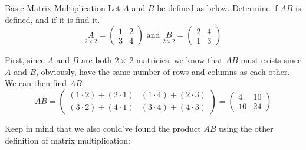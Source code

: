 \begin{example}{Basic Matrix Multiplication}{}
    Let $A$ and $B$ be defined as below. Determine if $AB$ is defined, and if it is find it.
    \[
        \underset{2 \times 2}{A} = \begin{pmatrix}
            1 & 2 \\ 3 & 4
        \end{pmatrix} 
        \text{ and }
        \underset{2 \times 2}{B} = \begin{pmatrix}
            2 & 4 \\ 1 & 3
        \end{pmatrix}
    \]
    \begin{solution}
        First, since $A$ and $B$ are both $2\times\,2$ matricies, we know that $AB$ must exists since $A$ and $B$, obviously, have the same number of rows and columns as each other. We can then find $AB$:
        \[
            AB = \begin{pmatrix}
                (1 \cdot 2) + (2 \cdot 1) & (1 \cdot 4) + (2 \cdot 3) \\
                (3 \cdot 2) + (4 \cdot 1) & (3 \cdot 4) + (4 \cdot 3)
            \end{pmatrix} 
            = 
            \begin{pmatrix}
                4 & 10 \\ 10 & 24
            \end{pmatrix}
        \]
    \end{solution}
\end{example}
Keep in mind that we also could've found the product $AB$ using the other definition of matrix multiplication:
